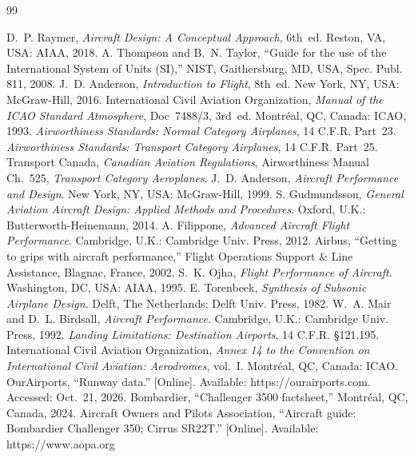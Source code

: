 \documentclass[11pt,letterpaper]{article}
\numberwithin{equation}{section}
\begin{document}
\begin{thebibliography}{99}\raggedright
{} D.~P. Raymer, \emph{Aircraft Design: A Conceptual Approach}, 6th~ed. Reston, VA, USA: AIAA, 2018.
 A. Thompson and B.~N. Taylor, ``Guide for the use of the International System of Units (SI),'' NIST, Gaithersburg, MD, USA, Spec. Publ. 811, 2008.
 J.~D. Anderson, \emph{Introduction to Flight}, 8th~ed. New York, NY, USA: McGraw-Hill, 2016.
 International Civil Aviation Organization, \emph{Manual of the ICAO Standard Atmosphere}, Doc~7488/3, 3rd~ed. Montr\'eal, QC, Canada: ICAO, 1993.
 \emph{Airworthiness Standards: Normal Category Airplanes}, 14 C.F.R. Part~23.
 \emph{Airworthiness Standards: Transport Category Airplanes}, 14 C.F.R. Part~25.
 Transport Canada, \emph{Canadian Aviation Regulations}, Airworthiness Manual Ch.~525, \emph{Transport Category Aeroplanes}.
 J.~D. Anderson, \emph{Aircraft Performance and Design}. New York, NY, USA: McGraw-Hill, 1999.
 S. Gudmundsson, \emph{General Aviation Aircraft Design: Applied Methods and Procedures}. Oxford, U.K.: Butterworth-Heinemann, 2014.
 A. Filippone, \emph{Advanced Aircraft Flight Performance}. Cambridge, U.K.: Cambridge Univ. Press, 2012.
 Airbus, ``Getting to grips with aircraft performance,'' Flight Operations Support \& Line Assistance, Blagnac, France, 2002.
 S.~K. Ojha, \emph{Flight Performance of Aircraft}. Washington, DC, USA: AIAA, 1995.
 E. Torenbeek, \emph{Synthesis of Subsonic Airplane Design}. Delft, The Netherlands: Delft Univ. Press, 1982.
 W.~A. Mair and D.~L. Birdsall, \emph{Aircraft Performance}. Cambridge, U.K.: Cambridge Univ. Press, 1992.
 \emph{Landing Limitations: Destination Airports}, 14 C.F.R. \S121.195.
 International Civil Aviation Organization, \emph{Annex 14 to the Convention on International Civil Aviation: Aerodromes}, vol.~I. Montr\'eal, QC, Canada: ICAO.
 OurAirports, ``Runway data.'' [Online]. Available: https://ourairports.com. Accessed: Oct.~21, 2026.
 Bombardier, ``Challenger 3500 factsheet,'' Montr\'eal, QC, Canada, 2024.
 Aircraft Owners and Pilots Association, ``Aircraft guide: Bombardier Challenger 350; Cirrus SR22T.'' [Online]. Available: https://www.aopa.org
\end{thebibliography}
\end{document}

